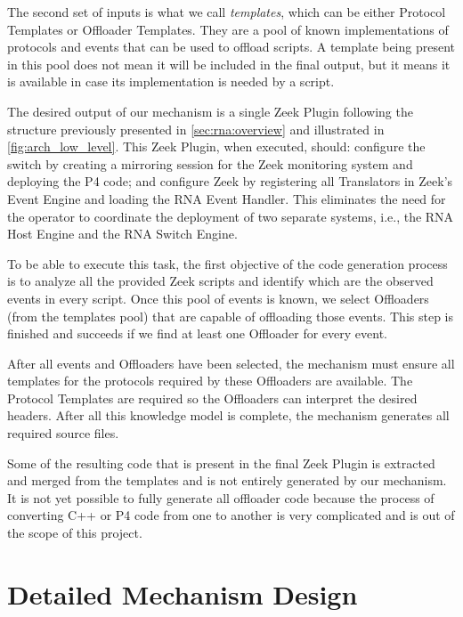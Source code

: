The second set of inputs is what we call \textit{templates}, which can be either  Protocol Templates or Offloader Templates. They are a pool of known implementations of protocols and events that can be used to offload scripts. A template being present in this pool does not mean it will be included in the final output, but it means it is available in case its implementation is needed by a script.

The desired output of our mechanism is a single Zeek Plugin following the structure previously presented in \autoref{sec:rna:overview} and illustrated in \autoref{fig:arch_low_level}. This Zeek Plugin, when executed, should: configure the switch by creating a mirroring session for the Zeek monitoring system and deploying the P4 code; and configure Zeek by registering all Translators in Zeek's Event Engine and loading the RNA Event Handler. This eliminates the need for the operator to coordinate the deployment of two separate systems, i.e., the RNA Host Engine and the RNA Switch Engine.

To be able to execute this task, the first objective of the code generation process is to analyze all the provided Zeek scripts and identify which are the observed events in every script. Once this pool of events is known, we select Offloaders (from the templates pool) that are capable of offloading those events. This step is finished and succeeds if we find at least one Offloader for every event.

After all events and Offloaders have been selected, the mechanism must ensure all templates for the protocols required by these Offloaders are available. The Protocol Templates are required so the Offloaders can interpret the desired headers. After all this knowledge model is complete, the mechanism generates all required source files.

Some of the resulting code that is present in the final Zeek Plugin is extracted and merged from the templates and is not entirely generated by our mechanism. It is not yet possible to fully generate all offloader code because the process of converting C++ or P4 code from one to another is very complicated and is out of the scope of this project.



\section{Detailed Mechanism Design}
\label{sec:code_gen:detailed}

